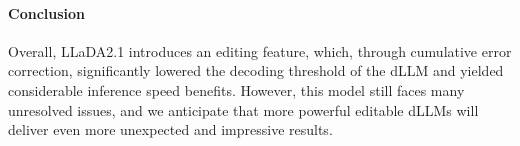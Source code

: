 \paragraph{Conclusion} Overall, LLaDA2.1 introduces an editing feature, which, through cumulative error correction, significantly lowered the decoding threshold of the dLLM and yielded considerable inference speed benefits. However, this model still faces many unresolved issues, and we anticipate that more powerful editable dLLMs will deliver even more unexpected and impressive results.
